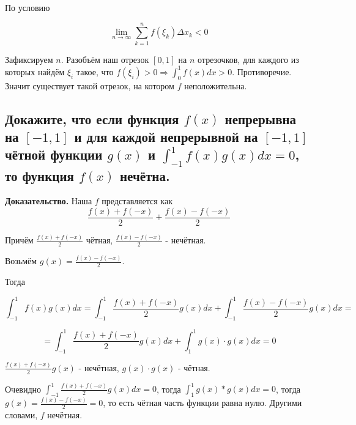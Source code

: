 \documentclass[a4paper]{article}
\begin{document}
По условию 

\[ \lim_{n \rightarrow \infty} \sum_{k=1}^n f(\xi_k) \Delta x_k < 0
\]

Зафиксируем $n$. Разобъём наш отрезок $[0,1]$ на $n$ отрезочков, для каждого из которых найдём $\xi_i$ такое, что $f(\xi_i) > 0 \Rightarrow \int_0^1 f(x)dx > 0$. Противоречие. Значит существует такой отрезок, на котором $f$ неположительна.

\subsection*{Докажите, что если функция $f(x)$ непрерывна на $[-1,1]$ и для каждой непрерывной на $[-1,1]$ чётной функции $g(x)$ и $\int_{-1}^1 f(x)g(x)dx = 0$, то функция $f(x)$ нечётна.}

\textbf{Доказательство.} Наша $f$ представляется как 
\[
\frac{f(x)+f(-x)}{2} + \frac{f(x)-f(-x)}{2}
\]

Причём $\frac{f(x)+f(-x)}{2}$ чётная, $\frac{f(x)-f(-x)}{2}$ - нечётная.

Возьмём $g(x) = \frac{f(x)-f(-x)}{2}$.

Тогда 

\[
\int_{-1}^1 f(x)g(x)dx = \int_{-1}^1 \frac{f(x)+f(-x)}{2} g(x) dx + \int_{-1}^1 \frac{f(x)-f(-x)}{2} g(x) dx = 
\]

\[
= \int_{-1}^1 \frac{f(x)+f(-x)}{2} g(x) dx + \int_1^1 g(x) \cdot g(x) dx = 0
\]

$\frac{f(x)+f(-x)}{2} g(x)$ - нечётная, $g(x)\cdot g(x)$ - чётная.

Очевидно $\int_{-1}^1 \frac{f(x)+f(-x)}{2} g(x) dx  = 0$, тогда $\int_1^1 g(x)*g(x) dx = 0$, тогда $g(x) = \frac{f(x)-f(-x)}{2} = 0$, то есть чётная часть функции равна нулю. Другими словами, $f$ нечётная.
\end{document}
